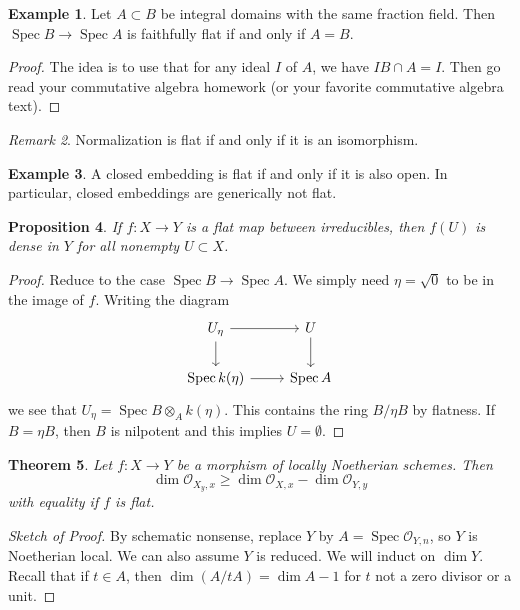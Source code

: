 \documentclass[leqno, openany]{memoir}
\newtheorem{thm}{Theorem}[section]
\newtheorem{prop}[thm]{Proposition}
\theoremstyle{definition}
\newtheorem{exm}[thm]{Example}
\theoremstyle{remark}
\newtheorem{rmk}[thm]{Remark}
\theoremstyle{plain}
\theoremstyle{definition}
\theoremstyle{remark}
\newcommand{\mc}[1]{\mathcal{#1}}
\DeclareMathOperator{\Spec}{Spec}
\begin{document}
\begin{exm} Let $A \subset B$ be integral domains with the same fraction field.
Then $\Spec B \to \Spec A$ is faithfully flat if and only if $A = B$.
\end{exm}

\begin{proof} The idea is to use that for any ideal $I$ of $A$, we have $IB
\cap A = I$. Then go read your commutative algebra homework (or your favorite
commutative algebra text).  \end{proof}

\begin{rmk} Normalization is flat if and only if it is an isomorphism.
\end{rmk}

\begin{exm} A closed embedding is flat if and only if it is also open. In
particular, closed embeddings are generically not flat.  \end{exm}

\begin{prop} If $f \colon X \to Y$ is a flat map between irreducibles, then
$f(U)$ is dense in $Y$ for all nonempty $U \subset X$.  \end{prop}

\begin{proof} Reduce to the case $\Spec B \to \Spec A$. We simply need $\eta =
    \sqrt{0}$ to be in the image of $f$. Writing the diagram \begin{equation*}
        \begin{tikzcd} U_{\eta} \arrow{r} \arrow{d} & U \arrow{d} \\ \Spec
            k(\eta) \arrow{r} & \Spec A \end{tikzcd} \end{equation*} we see
            that $U_{\eta} = \Spec B \otimes_A k(\eta)$. This contains the ring
            $B / \eta B$ by flatness. If $B = \eta B$, then $B$ is nilpotent
            and this implies $U = \emptyset$.  \end{proof}

\begin{thm} Let $f \colon X \to Y$ be a morphism of locally Noetherian schemes.
    Then \[ \dim \mc{O}_{X_y, x} \geq \dim \mc{O}_{X,x} - \dim \mc{O}_{Y,y} \]
with equality if $f$ is flat.  \end{thm}

\begin{proof}[Sketch of Proof] By schematic nonsense, replace $Y$ by $A = \Spec
    \mc{O}_{Y,n}$, so $Y$ is Noetherian local. We can also assume $Y$ is
    reduced. We will induct on $\dim Y$. Recall that if $t \in A$, then $\dim
    (A/tA) = \dim A - 1$ for $t$ not a zero divisor or a unit.  \end{proof}
\end{document}
